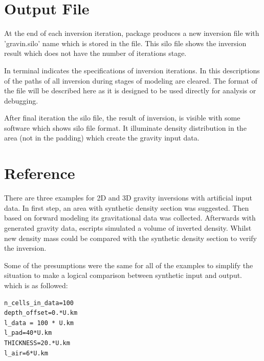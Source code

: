 \section{Output File}

At the end of each inversion iteration, package produces a new inversion file with 'gravin.silo' name which is stored in the file. This silo file shows the inversion result which does not have the number of iterations stage.

 In terminal indicates the specifications of inversion iterations. In this descriptions of the paths of all inversion during stages of modeling are cleared. The format of the file will be described here as it is designed to be used directly for analysis or debugging.

After final iteration the silo file, the result of inversion, is visible with some software which shows silo file format. It illuminate density distribution in the area (not in the padding) which create the gravity input data.

\section{Reference}

There are three examples for 2D and 3D gravity inversions with artificial input data.
In first step, an area with synthetic density section was suggested. Then based on forward modeling its gravitational data was collected. Afterwards with generated gravity data, escripts simulated a volume of inverted density. Whilst new density mass could be compared with the synthetic density section to verify the inversion.

Some of the presumptions were the same for all of the examples to simplify the situation to make a logical comparison between synthetic input and output. which is as followed:

\begin{verbatim}
n_cells_in_data=100
depth_offset=0.*U.km
l_data = 100 * U.km
l_pad=40*U.km
THICKNESS=20.*U.km
l_air=6*U.km
\end{verbatim}

